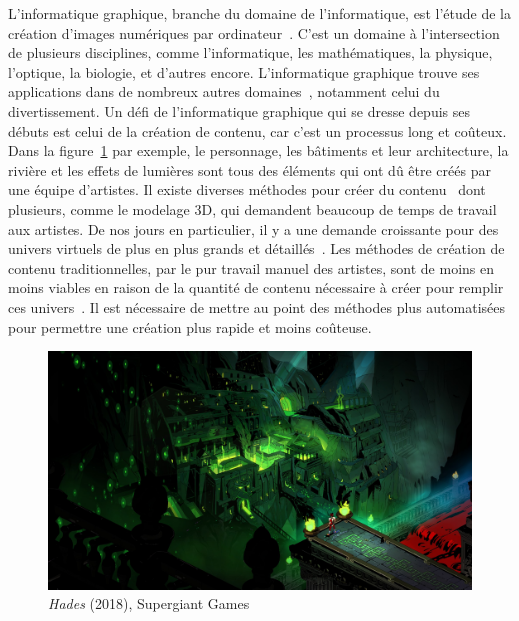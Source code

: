 \Introduction
\label{chap:introduction}

L'informatique graphique, branche du domaine de l'informatique, est l'étude de la création d'images numériques par ordinateur~\cite{poinssac_infographie_1994}. C'est un domaine à l'intersection de plusieurs disciplines, comme l'informatique, les mathématiques, la physique, l'optique, la biologie, et d'autres encore. L'informatique graphique trouve ses applications dans de nombreux autres domaines~\cite{ekaran_when_2021}, notamment celui du divertissement. Un défi de l'informatique graphique qui se dresse depuis ses débuts est celui de la création de contenu, car c'est un processus long et coûteux. Dans la figure~\ref{fig:hades} par exemple, le personnage, les bâtiments et leur architecture, la rivière et les effets de lumières sont tous des éléments qui ont dû être créés par une équipe d'artistes. Il existe diverses méthodes pour créer du contenu~\cite{juegoadmin_why_2023} dont plusieurs, comme le modelage 3D, qui demandent beaucoup de temps de travail aux artistes. De nos jours en particulier, il y a une demande croissante pour des univers virtuels de plus en plus grands et détaillés~\cite{imam_open_2022}. Les méthodes de création de contenu traditionnelles, par le pur travail manuel des artistes, sont de moins en moins viables en raison de la quantité de contenu nécessaire à créer pour remplir ces univers~\cite{freiknecht_survey_2017}. Il est nécessaire de mettre au point des méthodes plus automatisées pour permettre une création plus rapide et moins coûteuse.

\bigskip

\begin{figure}[!h]
    \centering
    \includegraphics[width=.85\textwidth]{contenu/resources/images/hades}
    \caption{{\it Hades} (2018), Supergiant Games~\cite{supergiant_hades_2018}}
    \label{fig:hades}
\end{figure}

